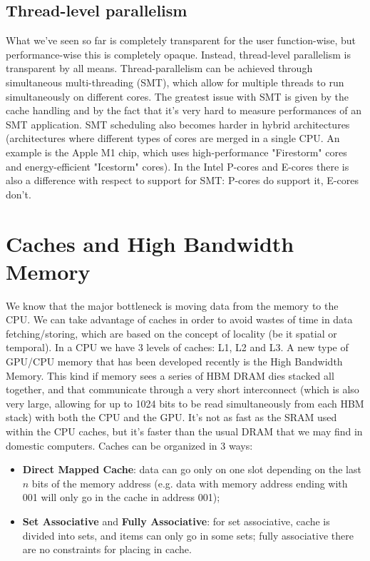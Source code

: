 \subsection{Thread-level parallelism}

What we've seen so far is completely transparent for the user function-wise, but performance-wise this is completely opaque. Instead, thread-level parallelism is transparent by all means. 
\nwl
Thread-parallelism can be achieved through simultaneous multi-threading (SMT), which allow for multiple threads to run simultaneously on different cores. The greatest issue with SMT is given by the cache handling and by the fact that it's very hard to measure performances of an SMT application.
\nwl
SMT scheduling also becomes harder in hybrid architectures (architectures where different types of cores are merged in a single CPU. An example is the Apple M1 chip, which uses high-performance "Firestorm" cores and energy-efficient "Icestorm" cores). In the Intel P-cores and E-cores there is also a difference with respect to support for SMT: P-cores do support it, E-cores don't.

\section{Caches and High Bandwidth Memory}

We know that the major bottleneck is moving data from the memory to the CPU. We can take advantage of caches in order to avoid wastes of time in data fetching/storing, which are based on the concept of locality (be it spatial or temporal). In a CPU we have 3 levels of caches: L1, L2 and L3.
\nwl
A new type of GPU/CPU memory that has been developed recently is the High Bandwidth Memory. This kind if memory sees a series of HBM DRAM dies stacked all together, and that communicate through a very short interconnect (which is also very large, allowing for up to 1024 bits to be read simultaneously from each HBM stack) with both the CPU and the GPU. It's not as fast as the SRAM used within the CPU caches, but it's faster than the usual DRAM that we may find in domestic computers.
\nwl
Caches can be organized in 3 ways:
\begin{itemize}
    \item \textbf{Direct Mapped Cache}: data can go only on one slot depending on the last $n$ bits of the memory address (e.g. data with memory address ending with 001 will only go in the cache in address 001);
    \item \textbf{Set Associative} and \textbf{Fully Associative}: for set associative, cache is divided into sets, and items can only go in some sets; fully associative there are no constraints for placing in cache.
\end{itemize}

